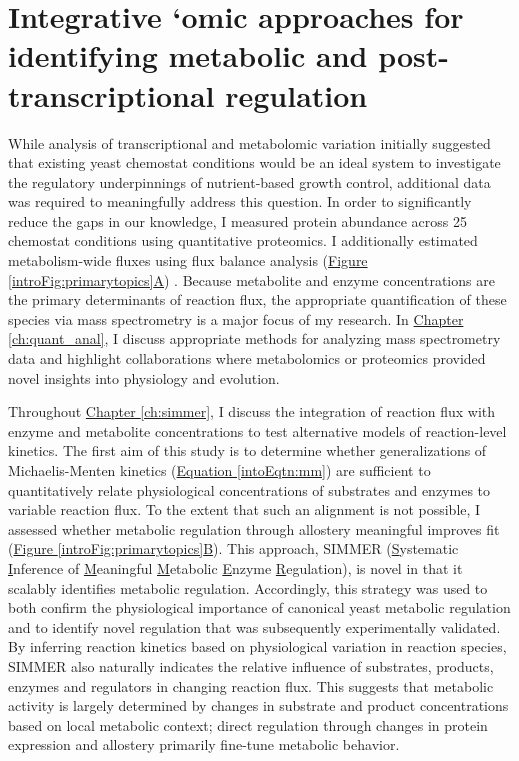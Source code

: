 \section{Integrative `omic approaches for identifying metabolic and post-transcriptional regulation}

While analysis of transcriptional and metabolomic variation initially suggested that existing yeast chemostat conditions would be an ideal system to investigate the regulatory underpinnings of nutrient-based growth control, additional data was required to meaningfully address this question. In order to significantly reduce the gaps in our knowledge, I measured protein abundance across 25 chemostat conditions using quantitative proteomics. I additionally estimated metabolism-wide fluxes using flux balance analysis (\hyperref[introFig:primarytopics]{Figure \ref{introFig:primarytopics}A}) \cite{Orth:2010hb}. Because metabolite and enzyme concentrations are the primary determinants of reaction flux, the appropriate quantification of these species via mass spectrometry is a major focus of my research. In \hyperref[ch:quant_anal]{Chapter \ref{ch:quant_anal}}, I discuss appropriate methods for analyzing mass spectrometry data and highlight collaborations where metabolomics or proteomics provided novel insights into physiology and evolution. 

Throughout \hyperref[ch:simmer]{Chapter \ref{ch:simmer}}, I discuss the integration of reaction flux with enzyme and metabolite concentrations to test alternative models of reaction-level kinetics. The first aim of this study is to determine whether generalizations of Michaelis-Menten kinetics (\hyperref[intoEqtn:mm]{Equation \ref{intoEqtn:mm}}) \cite{Liebermeister:2006fm} are sufficient to quantitatively relate physiological concentrations of substrates and enzymes to variable reaction flux.  To the extent that such an alignment is not possible, I assessed whether metabolic regulation through allostery meaningful improves fit (\hyperref[introFig:primarytopics]{Figure \ref{introFig:primarytopics}B}).  This approach, SIMMER (\underline{S}ystematic \underline{I}nference of \underline{M}eaningful \underline{M}etabolic \underline{E}nzyme \underline{R}egulation), is novel in that it scalably identifies metabolic regulation. Accordingly, this strategy was used to both confirm the physiological importance of canonical yeast metabolic regulation and to identify novel regulation that was subsequently experimentally validated. By inferring reaction kinetics based on physiological variation in reaction species, SIMMER also naturally indicates the relative influence of substrates, products, enzymes and regulators in changing reaction flux. This suggests that metabolic activity is largely determined by changes in substrate and product concentrations based on local metabolic context; direct regulation through changes in protein expression and allostery primarily fine-tune metabolic behavior.

